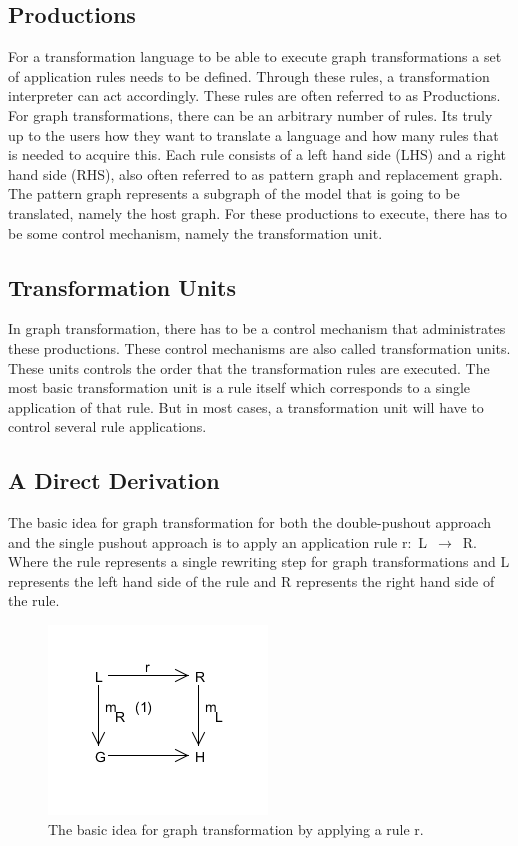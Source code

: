 \subsection{Productions}
For a transformation language to be able to execute graph
transformations a set of application rules needs to be defined. Through these
rules, a transformation interpreter can act accordingly. These rules are often
referred to as Productions. For graph transformations, there can be an arbitrary
number of rules. Its truly up to the users how they want to translate a
language and how many rules that is needed to acquire this. Each rule consists
of a left hand side (LHS) and a right hand side (RHS), also often referred to as
pattern graph and replacement graph. The pattern graph represents a subgraph of
the model that is going to be translated, namely the host graph. For these
productions to execute, there has to be some control mechanism, namely the
transformation unit.


\subsection{Transformation Units}
In graph transformation, there has to be a control mechanism that
administrates these productions. These control mechanisms are also called
transformation units. These units controls the order that the transformation
rules are executed. The most basic transformation unit is a rule itself which
corresponds to a single application of that rule. But in most cases, a
transformation unit will have to control several rule applications. 

\subsection{A Direct Derivation}
The basic idea for graph transformation for both the double-pushout
approach and the single pushout approach is to apply an application rule
\mbox{r: L $\longrightarrow$ R}. Where the rule represents a single rewriting
step for graph transformations and L represents the left hand side of the rule and R
represents the right hand side of the rule.

\begin{figure}[H]
	\centering
	\includegraphics[scale=0.7]{./Figures/Single_Pushout_Appr.png}
	\caption[Idea of graph transformation]
	{The basic idea for graph transformation by applying a rule r.}
	\label{fig:GraphTransformationGeneral}
\end{figure}

